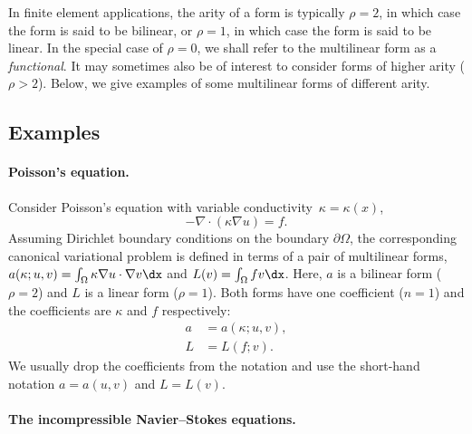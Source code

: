 In finite element applications, the arity of a form is typically $\rho
= 2$, in which case the form is said to be bilinear, or $\rho = 1$, in
which case the form is said to be linear. In the special case of $\rho
= 0$, we shall refer to the multilinear form as a
\emph{functional}. It may sometimes also be of interest to consider
forms of higher arity ($\rho > 2$). Below, we give examples of some
multilinear forms of different arity.

\subsection{Examples}

\paragraph{Poisson's equation.}

Consider Poisson's equation with variable conductivity~$\kappa =
\kappa(x)$,
\begin{equation}
  -\nabla \cdot (\kappa \nabla u) = f.
\end{equation}
Assuming Dirichlet boundary conditions on the boundary
$\partial\Omega$, the corresponding canonical
variational problem is defined in terms of a pair of multilinear
forms, $a(\kappa; u, v) = \int_{\Omega} \kappa \nabla u \cdot \nabla
v \dx$ and $L(v) = \int_{\Omega} f v \dx$. Here, $a$ is a bilinear
form ($\rho = 2$) and $L$ is a linear form ($\rho = 1$). Both forms
have one coefficient ($n = 1$) and the coefficients are $\kappa$ and
$f$ respectively:
\begin{equation}
  \begin{split}
    a &= a(\kappa; u, v), \\
    L &= L(f; v).
  \end{split}
\end{equation}
We usually drop the coefficients from the notation and use the
short-hand notation $a = a(u, v)$ and $L = L(v)$.

\paragraph{The incompressible Navier--Stokes equations.}

